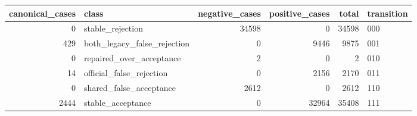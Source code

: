 \begin{tabular}{rlrrrl}
\toprule
canonical\_cases & class & negative\_cases & positive\_cases & total & transition \\
\midrule
0 & stable\_rejection & 34598 & 0 & 34598 & 000 \\
429 & both\_legacy\_false\_rejection & 0 & 9446 & 9875 & 001 \\
0 & repaired\_over\_acceptance & 2 & 0 & 2 & 010 \\
14 & official\_false\_rejection & 0 & 2156 & 2170 & 011 \\
0 & shared\_false\_acceptance & 2612 & 0 & 2612 & 110 \\
2444 & stable\_acceptance & 0 & 32964 & 35408 & 111 \\
\bottomrule
\end{tabular}
